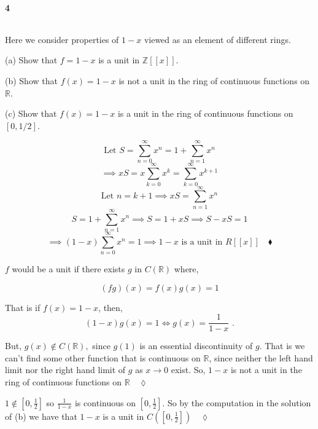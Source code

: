 \documentclass{article}
\newcommand\Z{\mathbb{Z}}
\newcommand\R{\mathbb{R}}
\begin{document}
\paragraph{4} $\text{ }$

Here we consider properties of $1 − x$ viewed as an element of different rings.

(a) Show that $f = 1 − x$ is a unit in $\Z[[x]]$.

(b) Show that $f (x) = 1 − x$ is not a unit in the ring of continuous functions on $\R$.

(c) Show that $f (x) = 1 − x$ is a unit in the ring of continuous
functions on $[0, 1/2]$.

\[\text{Let } S = \sum_{n=0}^\infty x^n = 1 + \sum_{n=1}^\infty x^n\]
\[\implies xS = x\sum_{k=0}^\infty x^k = \sum_{k=0}^\infty x^{k+1} \]
\[ \text{Let } n = k+1 \implies xS = \sum_{n=1}^\infty x^n \]
\[ S =  1 + \sum_{n=1}^\infty x^n \implies S =
  1 + xS \implies S-xS = 1\]
\[\implies (1-x)\sum_{n=0}^{\infty}x^n = 1 \implies 1-x\text{ is a unit
    in }R[[x]]\quad \blacklozenge\]


$f$ would be a unit if there exists $g$ in $C(\R)$ where,

\[(fg)(x) = f(x)g(x) = 1\]

That is if $f(x) = 1-x$, then, \[(1-x)g(x) = 1 \iff g(x) =
  \frac{1}{1-x}\text{ .}\]

But, $g(x) \not\in C(\R),$ since $g(1)$ is an essential discontinuity
of $g$. That is we can't find some other function that is
continuous on $\R$, since neither the left hand limit nor the right
hand limit of $g$
as $x\rightarrow 0$ exist. So, $1-x$ is not a unit in the ring of
continuous functions on $\R\quad \lozenge$


$1\not\in [0,\frac{1}{2}]$ so $\frac{1}{1-x}$ is continuous on
$[0,\frac{1}{2}]$. So by the computation in the solution of (b) we
have that $1-x$ is a unit in $C([0,\frac{1}{2}])\quad \lozenge$
\end{document}
